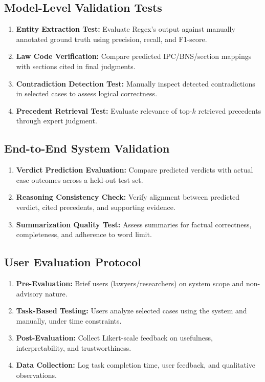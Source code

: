 \subsection{Model-Level Validation Tests}
\begin{enumerate}
	\item \textbf{Entity Extraction Test:} Evaluate Regex's output against manually annotated ground truth using precision, recall, and F1-score.
	\item \textbf{Law Code Verification:} Compare predicted IPC/BNS/section mappings with sections cited in final judgments.
	\item \textbf{Contradiction Detection Test:} Manually inspect detected contradictions in selected cases to assess logical correctness.
	\item \textbf{Precedent Retrieval Test:} Evaluate relevance of top-$k$ retrieved precedents through expert judgment.
\end{enumerate}

\subsection{End-to-End System Validation}
\begin{enumerate}
	\item \textbf{Verdict Prediction Evaluation:} Compare predicted verdicts with actual case outcomes across a held-out test set.
	\item \textbf{Reasoning Consistency Check:} Verify alignment between predicted verdict, cited precedents, and supporting evidence.
	\item \textbf{Summarization Quality Test:} Assess summaries for factual correctness, completeness, and adherence to word limit.
\end{enumerate}

\subsection{User Evaluation Protocol}
\begin{enumerate}
	\item \textbf{Pre-Evaluation:} Brief users (lawyers/researchers) on system scope and non-advisory nature.
	\item \textbf{Task-Based Testing:} Users analyze selected cases using the system and manually, under time constraints.
	\item \textbf{Post-Evaluation:} Collect Likert-scale feedback on usefulness, interpretability, and trustworthiness.
	\item \textbf{Data Collection:} Log task completion time, user feedback, and qualitative observations.
\end{enumerate}



